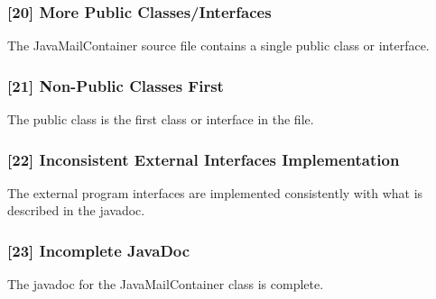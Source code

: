 \subsubsection{[20] More Public Classes/Interfaces}
The JavaMailContainer source file contains a single public class or interface. 
\subsubsection{[21] Non-Public Classes First}
The public class is the first class or interface in the file.
\subsubsection{[22] Inconsistent External Interfaces Implementation}
The external program interfaces are implemented consistently with what is described in the javadoc.
\subsubsection{[23] Incomplete JavaDoc}
The javadoc for the JavaMailContainer class is complete.
